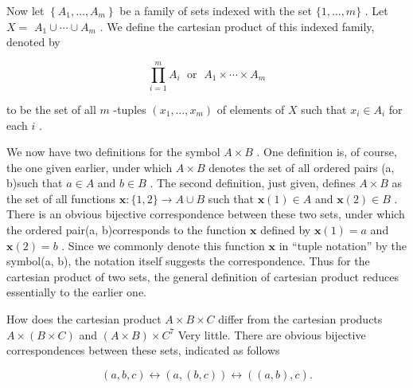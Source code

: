 Now let \(\left\{  {{A}_{1},\ldots ,{A}_{m}}\right\}\) be a family of sets indexed with the set \(\{ 1,\ldots ,m\}\) . Let \(X =\)  \({A}_{1} \cup  \cdots  \cup  {A}_{m}\) . We define the cartesian product of this indexed family, denoted by

\[
\mathop{\prod }\limits_{{i = 1}}^{m}{A}_{i}\;\text{ or }\;{A}_{1} \times  \cdots  \times  {A}_{m}
\]

to be the set of all \(m\) -tuples \(\left( {{x}_{1},\ldots ,{x}_{m}}\right)\) of elements of \(X\) such that \({x}_{i} \in  {A}_{i}\) for each \(i\) .

\begin{centeredblock}
\begin{example} We now have two definitions for the symbol \(A \times  B\) . One definition is, of course, the one given earlier, under which \(A \times  B\) denotes the set of all ordered pairs (a, b)such that \(a \in  A\) and \(b \in  B\) . The second definition, just given, defines \(A \times  B\) as the set of all functions \(\mathbf{x} : \{ 1,2\}  \rightarrow  A \cup  B\) such that \(\mathbf{x}\left( 1\right)  \in  A\) and \(\mathbf{x}\left( 2\right)  \in  B\) . There is an obvious bijective correspondence between these two sets, under which the ordered pair(a, b)corresponds to the function \(\mathbf{x}\) defined by \(\mathbf{x}\left( 1\right)  = a\) and \(\mathbf{x}\left( 2\right)  = b\) . Since we commonly denote this function \(\mathbf{x}\) in ``tuple notation'' by the symbol(a, b), the notation itself suggests the correspondence. Thus for the cartesian product of two sets, the general definition of cartesian product reduces essentially to the earlier one.
\end{example}
\end{centeredblock}

\begin{centeredblock}
\begin{example} How does the cartesian product \(A \times  B \times  C\) differ from the cartesian products \(A \times  \left( {B \times  C}\right)\) and \(\left( {A \times  B}\right)  \times  {C}^{7}\) Very little. There are obvious bijective correspondences between these sets, indicated as follows

\[
\left( {a,b,c}\right)  \leftrightarrow  \left( {a,\left( {b,c}\right) }\right)  \leftrightarrow  \left( {\left( {a,b}\right) ,c}\right) .
\]
\end{example}
\end{centeredblock}


